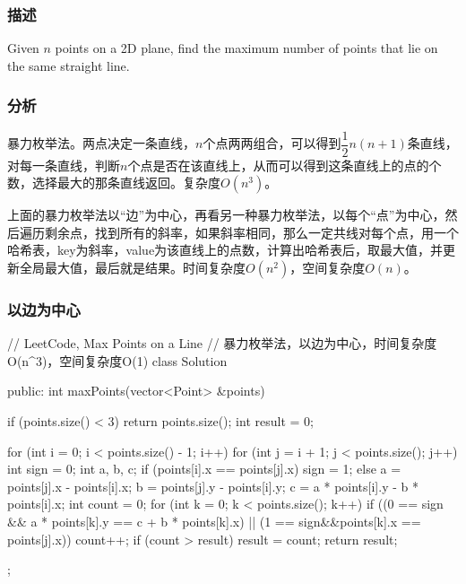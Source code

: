 \subsubsection{描述}
Given $n$ points on a 2D plane, find the maximum number of points that lie on the same straight line.


\subsubsection{分析}
暴力枚举法。两点决定一条直线，$n$个点两两组合，可以得到$\dfrac{1}{2}n(n+1)$条直线，对每一条直线，判断$n$个点是否在该直线上，从而可以得到这条直线上的点的个数，选择最大的那条直线返回。复杂度$O(n^3)$。

上面的暴力枚举法以“边”为中心，再看另一种暴力枚举法，以每个“点”为中心，然后遍历剩余点，找到所有的斜率，如果斜率相同，那么一定共线对每个点，用一个哈希表，key为斜率，value为该直线上的点数，计算出哈希表后，取最大值，并更新全局最大值，最后就是结果。时间复杂度$O(n^2)$，空间复杂度$O(n)$。


\subsubsection{以边为中心}
\begin{Code}
// LeetCode, Max Points on a Line
// 暴力枚举法，以边为中心，时间复杂度O(n^3)，空间复杂度O(1)
class Solution {
public:
    int maxPoints(vector<Point> &points) {
        if (points.size() < 3) return points.size();
        int result = 0;

        for (int i = 0; i < points.size() - 1; i++) {
            for (int j = i + 1; j < points.size(); j++) {
                int sign = 0;
                int a, b, c;
                if (points[i].x == points[j].x) sign = 1;
                else {
                    a = points[j].x - points[i].x;
                    b = points[j].y - points[i].y;
                    c = a * points[i].y - b * points[i].x;
                }
                int count = 0;
                for (int k = 0; k < points.size(); k++) {
                    if ((0 == sign && a * points[k].y == c +  b * points[k].x) || 
                        (1 == sign&&points[k].x == points[j].x)) 
                        count++;
                }
                if (count > result) result = count;
            }
        }
        return result;
    }
};
\end{Code}


